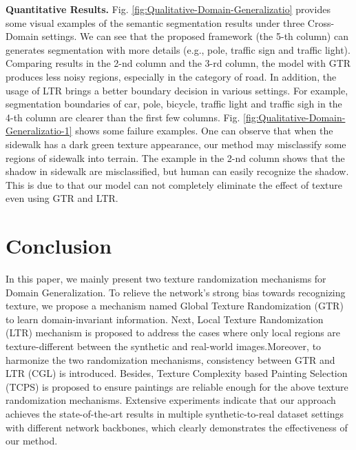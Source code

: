 \documentclass[twocolumn,journal,vlined,ruled,linesnumbered]{IEEEtran}
\begin{document}
\textbf{Quantitative Results.} Fig. \ref{fig:Qualitative-Domain-Generalizatio} provides some visual examples of the semantic segmentation results under three Cross-Domain settings. We can see that the proposed framework (the 5-th column) can generates segmentation with more details (e.g., pole, traffic sign and traffic light). Comparing results in the 2-nd column and the 3-rd column, the model with GTR produces less noisy regions, especially in the category of road. In addition, the usage of LTR brings a better boundary decision in various settings. For example, segmentation boundaries of car, pole, bicycle, traffic light and traffic sigh in the 4-th column are clearer than the first few columns. Fig. \ref{fig:Qualitative-Domain-Generalizatio-1} shows some failure examples. One can observe that when the sidewalk has a dark green texture appearance, our method may misclassify some regions of sidewalk into terrain. The example in the 2-nd column shows that the shadow in sidewalk are misclassified, but human can easily recognize the shadow. This is due to that our model can not completely eliminate the effect of texture even using GTR and LTR.

\section{Conclusion\label{sec:Conclusion}}

In this paper, we mainly present two texture randomization mechanisms for Domain Generalization. To relieve the network's strong bias towards recognizing texture, we propose a mechanism named Global Texture Randomization (GTR) to learn domain-invariant information. Next, Local Texture Randomization (LTR) mechanism is proposed to address the cases where only local regions are texture-different between the synthetic and real-world images.Moreover, to harmonize the two randomization mechanisms, consistency between GTR and LTR (CGL) is introduced. Besides, Texture Complexity based Painting Selection (TCPS) is proposed to ensure paintings are reliable enough for the above texture randomization mechanisms. Extensive experiments indicate that our approach achieves the state-of-the-art results in multiple synthetic-to-real dataset settings with different network backbones, which clearly demonstrates the effectiveness of our method.


{\small{}

}{\small\par}
\end{document}
